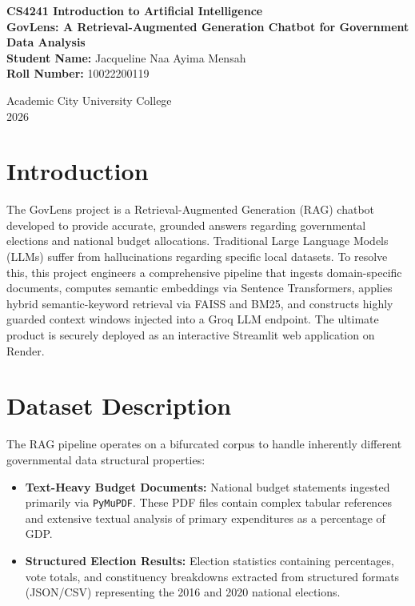 \documentclass[12pt, a4paper]{article}
\begin{document}
\begin{titlepage}
    \centering
    \vspace*{2cm}
    
    {\Large \textbf{CS4241 Introduction to Artificial Intelligence}}\\[1cm]
    
    {\Huge \textbf{GovLens: A Retrieval-Augmented Generation Chatbot for Government Data Analysis}}\\[2cm]
    
    \textbf{Student Name:} Jacqueline Naa Ayima Mensah\\
    \textbf{Roll Number:} 10022200119\\[2cm]
    
    \vfill
    
    {\large Academic City University College\\2026}
\end{titlepage}

\newpage
\tableofcontents
\newpage

\section{Introduction}
The GovLens project is a Retrieval-Augmented Generation (RAG) chatbot developed to provide accurate, grounded answers regarding governmental elections and national budget allocations. Traditional Large Language Models (LLMs) suffer from hallucinations regarding specific local datasets. To resolve this, this project engineers a comprehensive pipeline that ingests domain-specific documents, computes semantic embeddings via Sentence Transformers, applies hybrid semantic-keyword retrieval via FAISS and BM25, and constructs highly guarded context windows injected into a Groq LLM endpoint. The ultimate product is securely deployed as an interactive Streamlit web application on Render.

\section{Dataset Description}
The RAG pipeline operates on a bifurcated corpus to handle inherently different governmental data structural properties:
\begin{itemize}
    \item \textbf{Text-Heavy Budget Documents:} National budget statements ingested primarily via \texttt{PyMuPDF}. These PDF files contain complex tabular references and extensive textual analysis of primary expenditures as a percentage of GDP.
    \item \textbf{Structured Election Results:} Election statistics containing percentages, vote totals, and constituency breakdowns extracted from structured formats (JSON/CSV) representing the 2016 and 2020 national elections.
\end{itemize}
\end{document}
